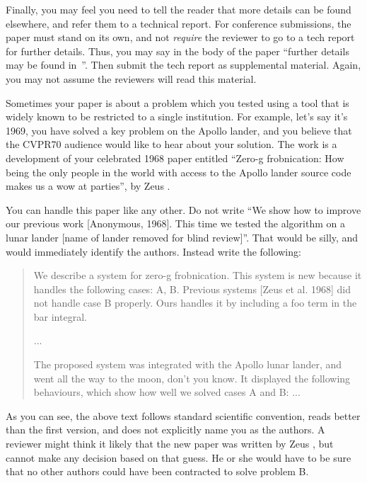 \documentclass[10pt,twocolumn,letterpaper]{article}
\begin{document}
    Finally, you may feel you need to tell the reader that more details can be found elsewhere, and refer them to a technical report.
    For conference submissions, the paper must stand on its own, and not {\em require} the reviewer to go to a tech report for further details.
    Thus, you may say in the body of the paper ``further details may be found in~\cite{Authors14b}''.
    Then submit the tech report as supplemental material.
    Again, you may not assume the reviewers will read this material.

    Sometimes your paper is about a problem which you tested using a tool that is widely known to be restricted to a single institution.
    For example, let's say it's 1969, you have solved a key problem on the Apollo lander, and you believe that the CVPR70 audience would like to hear about your
    solution.
    The work is a development of your celebrated 1968 paper entitled ``Zero-g frobnication: How being the only people in the world with access to the Apollo lander source code makes us a wow at parties'', by Zeus \etal.

    You can handle this paper like any other.
    Do not write ``We show how to improve our previous work [Anonymous, 1968].
    This time we tested the algorithm on a lunar lander [name of lander removed for blind review]''.
    That would be silly, and would immediately identify the authors.
    Instead write the following:
    \begin{quotation}
        \noindent
        We describe a system for zero-g frobnication.
        This system is new because it handles the following cases:
        A, B. Previous systems [Zeus et al. 1968] did not handle case B properly.
        Ours handles it by including a foo term in the bar integral.

        ...

        The proposed system was integrated with the Apollo lunar lander, and went all the way to the moon, don't you know.
        It displayed the following behaviours, which show how well we solved cases A and B: ...
    \end{quotation}
    As you can see, the above text follows standard scientific convention, reads better than the first version, and does not explicitly name you as the authors.
    A reviewer might think it likely that the new paper was written by Zeus \etal, but cannot make any decision based on that guess.
    He or she would have to be sure that no other authors could have been contracted to solve problem B.
    \medskip
\end{document}
